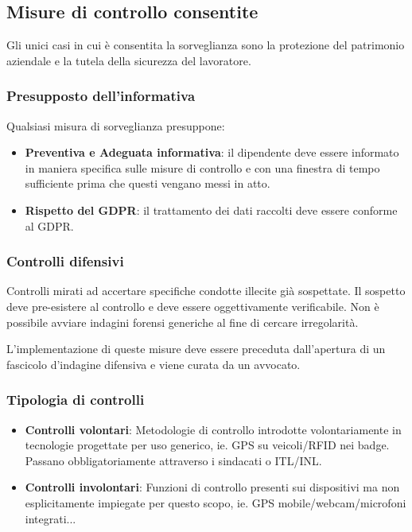 \documentclass[11pt,a4paper]{article}
\begin{document}
\subsection{Misure di controllo consentite}
Gli unici casi in cui è consentita la sorveglianza sono la protezione del patrimonio aziendale e la tutela della sicurezza del lavoratore.

\subsubsection{Presupposto dell'informativa}
Qualsiasi misura di sorveglianza presuppone:
\begin{itemize}
    \item \textbf{Preventiva e Adeguata informativa}: il dipendente deve essere informato in maniera specifica sulle misure di controllo e con una finestra di tempo sufficiente prima che questi vengano messi in atto.
    \item \textbf{Rispetto del GDPR}: il trattamento dei dati raccolti deve essere conforme al GDPR.
\end{itemize}

\subsubsection{Controlli difensivi}
Controlli mirati ad accertare specifiche condotte illecite già sospettate. Il sospetto deve pre-esistere al controllo e deve essere oggettivamente verificabile. Non è possibile avviare indagini forensi generiche al fine di cercare irregolarità.

L'implementazione di queste misure deve essere preceduta dall'apertura di un fascicolo d'indagine difensiva e viene curata da un avvocato.

\subsubsection{Tipologia di controlli}
\begin{itemize}
    \item \textbf{Controlli volontari}: Metodologie di controllo introdotte volontariamente in tecnologie progettate per uso generico, ie. GPS su veicoli/RFID nei badge. Passano obbligatoriamente attraverso i sindacati o ITL/INL.
    \item \textbf{Controlli involontari}: Funzioni di controllo presenti sui dispositivi ma non esplicitamente impiegate per questo scopo, ie. GPS mobile/webcam/microfoni integrati...
\end{itemize}
\end{document}
